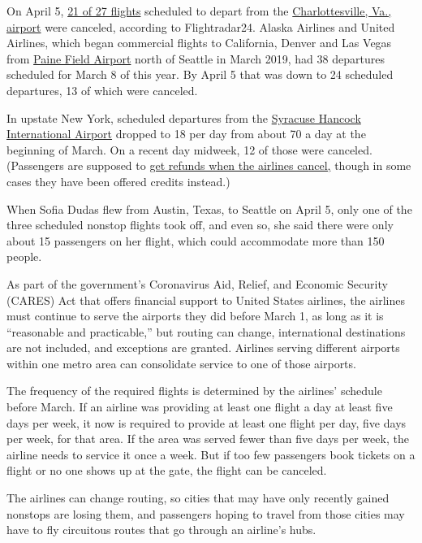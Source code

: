 On April 5,
\href{https://www.flightradar24.com/data/airports/cho/statistics}{21 of
27 flights} scheduled to depart from the
\href{http://www.gocho.com/flight-info/arrivals-departures/}{Charlottesville,
Va., airport} were canceled, according to Flightradar24. Alaska Airlines
and United Airlines, which began commercial flights to California,
Denver and Las Vegas from \href{https://www.painefield.com/}{Paine Field
Airport} north of Seattle in March 2019, had 38 departures scheduled for
March 8 of this year. By April 5 that was down to 24 scheduled
departures, 13 of which were canceled.

In upstate New York, scheduled departures from the
\href{https://syrairport.org/}{Syracuse Hancock International Airport}
dropped to 18 per day from about 70 a day at the beginning of March. On
a recent day midweek, 12 of those were canceled. (Passengers are
supposed to
\href{https://www.nytimes3xbfgragh.onion/reuters/2020/04/07/business/07reuters-health-coronavirus-airlines-iata.html}{get
refunds when the airlines cancel,} though in some cases they have been
offered credits instead.)

When Sofia Dudas flew from Austin, Texas, to Seattle on April 5, only
one of the three scheduled nonstop flights took off, and even so, she
said there were only about 15 passengers on her flight, which could
accommodate more than 150 people.

As part of the government's Coronavirus Aid, Relief, and Economic
Security (CARES) Act that offers financial support to United States
airlines, the airlines must continue to serve the airports they did
before March 1, as long as it is ``reasonable and practicable,'' but
routing can change, international destinations are not included, and
exceptions are granted. Airlines serving different airports within one
metro area can consolidate service to one of those airports.

The frequency of the required flights is determined by the airlines'
schedule before March. If an airline was providing at least one flight a
day at least five days per week, it now is required to provide at least
one flight per day, five days per week, for that area. If the area was
served fewer than five days per week, the airline needs to service it
once a week. But if too few passengers book tickets on a flight or no
one shows up at the gate, the flight can be canceled.

The airlines can change routing, so cities that may have only recently
gained nonstops are losing them, and passengers hoping to travel from
those cities may have to fly circuitous routes that go through an
airline's hubs.

